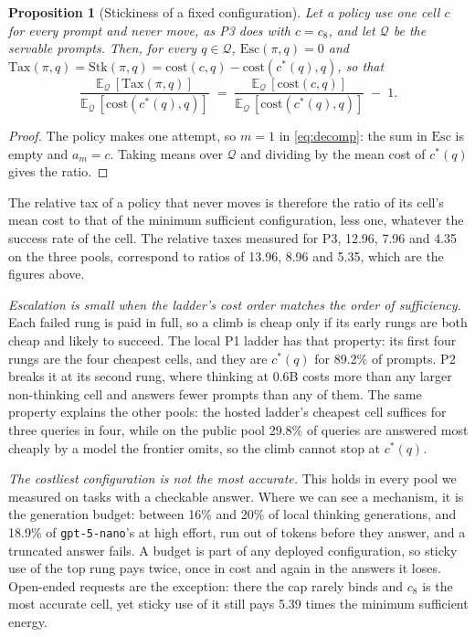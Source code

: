 \documentclass[final,5p,times,twocolumn]{elsarticle}
\theoremstyle{plain}
\newtheorem{proposition}{Proposition}
\newcommand{\cstar}{c^{*}}
\newcommand{\cost}{\mathrm{cost}}
\newcommand{\Tax}{\mathrm{Tax}}
\newcommand{\Esc}{\mathrm{Esc}}
\newcommand{\Stk}{\mathrm{Stk}}
\begin{document}
\begin{proposition}[Stickiness of a fixed configuration]
\label{prop:sticky}
Let a policy use one cell $c$ for every prompt and never move, as P3 does with
$c = c_8$, and let $\mathcal{Q}$ be the servable prompts. Then, for every
$q \in \mathcal{Q}$, $\Esc(\pi, q) = 0$ and
$\Tax(\pi, q) = \Stk(\pi, q) = \cost(c, q) - \cost(\cstar(q), q)$, so that
\[
  \frac{\mathbb{E}_{\mathcal{Q}}\,[\Tax(\pi, q)]}
       {\mathbb{E}_{\mathcal{Q}}\,[\cost(\cstar(q), q)]}
  \;=\; \frac{\mathbb{E}_{\mathcal{Q}}\,[\cost(c, q)]}
             {\mathbb{E}_{\mathcal{Q}}\,[\cost(\cstar(q), q)]} \;-\; 1 .
\]
\end{proposition}
\begin{proof}
The policy makes one attempt, so $m = 1$ in \eqref{eq:decomp}: the sum in
$\Esc$ is empty and $a_m = c$. Taking means over $\mathcal{Q}$ and dividing by
the mean cost of $\cstar(q)$ gives the ratio.
\end{proof}
The relative tax of a policy that never moves is therefore the ratio of its
cell's mean cost to that of the minimum sufficient configuration, less one,
whatever the success rate of the cell. The relative taxes measured for P3,
12.96, 7.96 and 4.35 on the three pools, correspond to ratios of 13.96, 8.96
and 5.35, which are the figures above.

\emph{Escalation is small when the ladder's cost order matches the order of
sufficiency.} Each failed rung is paid in full, so a climb is cheap only if
its early rungs are both cheap and likely to succeed. The local P1 ladder has
that property: its first four rungs are the four cheapest cells, and they are
$\cstar(q)$ for 89.2\% of prompts. P2 breaks it at its second rung, where
thinking at 0.6B costs more than any larger non-thinking cell and answers
fewer prompts than any of them. The same property explains the other pools:
the hosted ladder's cheapest cell suffices for three queries in four, while
on the public pool 29.8\% of queries are answered most cheaply by a model the
frontier omits, so the climb cannot stop at $\cstar(q)$.

\emph{The costliest configuration is not the most accurate.} This holds in
every pool we measured on tasks with a checkable answer. Where we can see a
mechanism, it is the generation budget: between 16\% and 20\% of local
thinking generations, and 18.9\% of \texttt{gpt-5-nano}'s at high effort, run
out of tokens before they answer, and a truncated answer fails. A budget is
part of any deployed configuration, so sticky use of the top rung pays twice,
once in cost and again in the answers it loses. Open-ended requests are the
exception: there the cap rarely binds and $c_8$ is the most accurate cell,
yet sticky use of it still pays 5.39 times the minimum sufficient energy.
\end{document}
